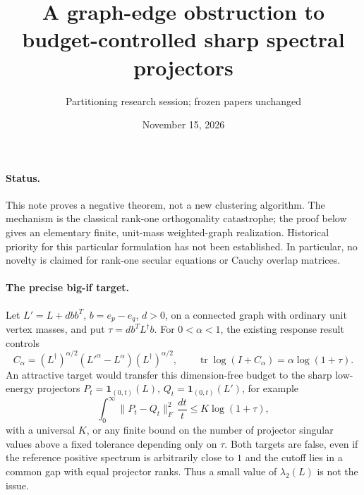 \documentclass[11pt]{article}
\title{A graph-edge obstruction to budget-controlled sharp spectral projectors}
\author{Partitioning research session; frozen papers unchanged}
\date{November 15, 2026}
\newcommand{\tr}{\operatorname{tr}}
\begin{document}
\maketitle

\paragraph{Status.}
This note proves a negative theorem, not a new clustering algorithm.
The mechanism is the classical rank-one orthogonality catastrophe;
the proof below gives an elementary finite, unit-mass weighted-graph
realization. Historical priority for this particular formulation has
not been established. In particular, no novelty is claimed for
rank-one secular equations or Cauchy overlap matrices.

\paragraph{The precise big-if target.}
Let $L'=L+dbb^T$, $b=e_p-e_q$, $d>0$, on a connected graph with
ordinary unit vertex masses, and put $\tau=db^TL^\dagger b$.
For $0<\alpha<1$, the existing response result controls
\[
 C_\alpha=(L^\dagger)^{\alpha/2}(L'^\alpha-L^\alpha)
                   (L^\dagger)^{\alpha/2},\qquad
 \tr\log(I+C_\alpha)=\alpha\log(1+\tau).
\]
An attractive target would transfer this dimension-free budget to
the sharp low-energy projectors $P_t=\mathbf1_{(0,t)}(L)$,
$Q_t=\mathbf1_{(0,t)}(L')$, for example
\begin{equation}\label{eq:target}
 \int_0^\infty\|P_t-Q_t\|_F^2\,\frac{dt}{t}
       \le K\log(1+\tau),
\end{equation}
with a universal $K$, or any finite bound on the number of projector
singular values above a fixed tolerance depending only on $\tau$.
Both targets are false, even if the reference positive spectrum is
arbitrarily close to $1$ and the cutoff lies in a common gap with equal
projector ranks. Thus a small value of $\lambda_2(L)$ is not the issue.
\end{document}
